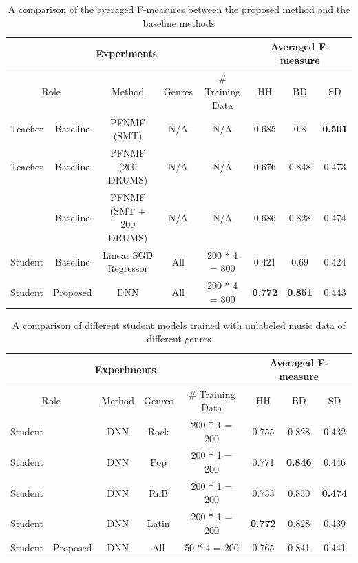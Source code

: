 \documentclass{article}
\begin{document}
\begin{table}[]
\centering
\begin{tabular}{cccccccc}
\hline
\multicolumn{5}{c}{Experiments}                                                & \multicolumn{3}{c}{Averaged F-measure}           \\ \hline
\multicolumn{2}{c}{Role} & Method                  & Genres & \# Training Data & HH             & BD             & SD             \\ \hline
Teacher    & Baseline    & PFNMF (SMT)             & N/A    & N/A              & 0.685          & 0.8            & \textbf{0.501} \\
Teacher    & Baseline    & PFNMF (200 DRUMS)       & N/A    & N/A              & 0.676          & 0.848          & 0.473          \\
           & Baseline    & PFNMF (SMT + 200 DRUMS) & N/A    & N/A              & 0.686          & 0.828          & 0.474          \\
Student    & Baseline    & Linear SGD Regressor    & All    & 200 * 4 = 800    & 0.421          & 0.69           & 0.424          \\
Student    & Proposed    & DNN                     & All    & 200 * 4 = 800    & \textbf{0.772} & \textbf{0.851} & 0.443          \\ \hline
\end{tabular}
\caption{A comparison of the averaged F-measures between the proposed method and the baseline methods}
\label{tab:all_results}
\end{table}






\begin{table}[]
\centering
\begin{tabular}{cccccccc}
\hline
\multicolumn{5}{c}{Experiments}                               & \multicolumn{3}{c}{Averaged F-measure}           \\ \hline
\multicolumn{2}{c}{Role} & Method & Genres & \# Training Data & HH             & BD             & SD             \\ \hline
Student    &             & DNN    & Rock   & 200 * 1 = 200    & 0.755          & 0.828          & 0.432          \\
Student    &             & DNN    & Pop    & 200 * 1 = 200    & 0.771          & \textbf{0.846} & 0.446          \\
Student    &             & DNN    & RnB    & 200 * 1 = 200    & 0.733          & 0.830          & \textbf{0.474} \\
Student    &             & DNN    & Latin  & 200 * 1 = 200    & \textbf{0.772} & 0.828          & 0.439          \\
Student    & Proposed    & DNN    & All    & 50 * 4 = 200     & 0.765          & 0.841          & 0.441          \\ \hline
\end{tabular}
\caption{A comparison of different student models trained with unlabeled music data of different genres}
\label{tab:genre_results}
\end{table}
\end{document}
